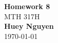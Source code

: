 \begin{titlepage}
    \begin{center}
        {\fontsize{40}{48}\selectfont \bfseries Homework 8}
        \\\vspace{20pt}
        {\LARGE MTH 317H} \\
        \vspace{20pt}
        \textbf{Huey Nguyen}
        \vspace{8pt}
        \\\today
    \end{center}
\end{titlepage}